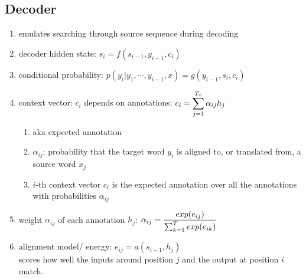 \subsection{Decoder}

\begin{enumerate}
    \item emulates searching through source sequence during decoding
    \hfill \cite{adv-ml-tech/paper/arxiv.org/1409.0473}

    \item decoder hidden state: $s_i = f(s_{i-1}, y_{i-1}, c_i)$
    \hfill \cite{adv-ml-tech/paper/arxiv.org/1409.0473}

    \item conditional probability: $p(y_i | y_1, \cdots , y_{i-1}, x) = g(y_{i-1}, s_i, c_i)$
    \hfill \cite{adv-ml-tech/paper/arxiv.org/1409.0473}


    \item context vector: $c_i$ depends on annotations:
    $
        c_i
        = \displaystyle\sum_{j=1}^{T_x} \alpha_{ij} h_j
    $
    \hfill \cite{adv-ml-tech/paper/arxiv.org/1409.0473}
    \begin{enumerate}
        \item aka expected annotation
        \hfill \cite{adv-ml-tech/paper/arxiv.org/1409.0473}
        
        \item $\alpha_{ij}$:  probability that the target word $y_i$ is aligned to, or translated from, a source word $x_j$
        \hfill \cite{adv-ml-tech/paper/arxiv.org/1409.0473}

        \item $i$-th context vector $c_i$ is the expected annotation over all the annotations with probabilities $\alpha_{ij}$
        \hfill \cite{adv-ml-tech/paper/arxiv.org/1409.0473}
    \end{enumerate}



    \item weight $\alpha_{ij}$ of each annotation $h_j$:
    $
        \alpha_{ij}
        = \dfrac{exp(e_{ij})}{\textstyle\sum_{k=1}^T exp(e_{ik})}
    $
    \hfill \cite{adv-ml-tech/paper/arxiv.org/1409.0473}

    \item alignment model/ energy: $e_{ij} = a(s_{i-1}, h_j)$\\
    scores how well the inputs around position $j$ and the output at position $i$ match.
    \hfill \cite{adv-ml-tech/paper/arxiv.org/1409.0473}
    

\end{enumerate}

